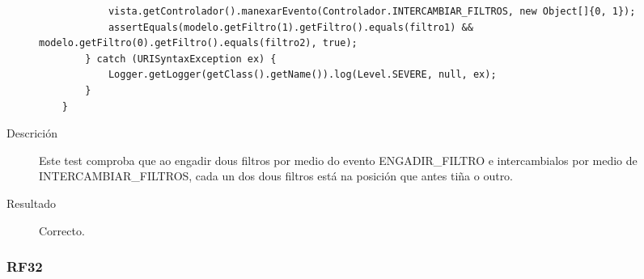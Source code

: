 \begin{description}
\begin{lstlisting}
            vista.getControlador().manexarEvento(Controlador.INTERCAMBIAR_FILTROS, new Object[]{0, 1});
            assertEquals(modelo.getFiltro(1).getFiltro().equals(filtro1) && modelo.getFiltro(0).getFiltro().equals(filtro2), true);
        } catch (URISyntaxException ex) {
            Logger.getLogger(getClass().getName()).log(Level.SEVERE, null, ex);
        }
    }
\end{lstlisting}
\item[Descrición]
Este test comproba que ao engadir dous filtros por medio do evento ENGADIR\_FILTRO e intercambialos por medio de INTERCAMBIAR\_FILTROS, cada un dos dous filtros está na posición que antes tiña o outro.
\item[Resultado]
Correcto.
\end{description}

\subsubsection*{RF32}
